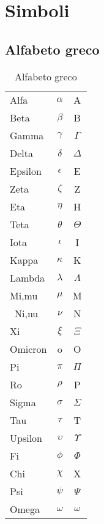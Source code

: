 \chapter{Simboli}
\label{cha:simboli}
\section{Alfabeto greco}
\label{sec:AlfabetoGreco}

\begin{table}[h!]
\centering
\begin{tabular}{lcc}
\toprule
Alfa&$\alpha$&A\\
Beta&$\beta$&B\\
Gamma&$\gamma$&$\Gamma$\\
Delta&$\delta$&$\Delta$\\
Epsilon&$\epsilon$&E\\
Zeta&$\zeta$&Z\\
Eta&$\eta$&H\\
Teta&$\theta$&$\Theta$\\
Iota&$\iota$&I\\
Kappa&$\kappa$&K\\
Lambda&$\lambda$&$\Lambda$\\
Mi,mu&$\mu$&M\\\
Ni,nu&$\nu$&N\\
Xi&$\xi$&$\Xi$\\
Omicron&o&O\\
Pi&$\pi$&$\Pi$\\
Ro&$\rho$&P\\
Sigma&$\sigma$&$\Sigma$\\
Tau&$\tau$&T\\
Upsilon&$\upsilon$&$\Upsilon$\\
Fi&$\phi$&$\Phi$\\
Chi&$\chi$&X\\
Psi&$\psi$&$\Psi$\\
Omega&$\omega$&$\omega$\\
\bottomrule	
\end{tabular}
\caption{Alfabeto greco}
\label{Tab:alfabetogreco}
\end{table}
